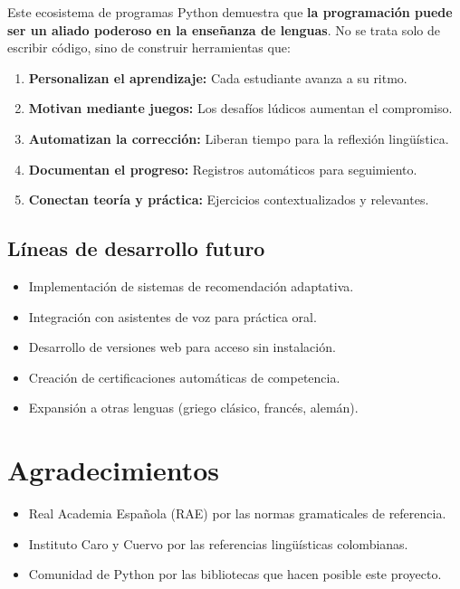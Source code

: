 \documentclass[12pt,spanish]{article}
\begin{document}
Este ecosistema de programas Python demuestra que \textbf{la programación puede ser un aliado poderoso en la enseñanza de lenguas}. No se trata solo de escribir código, sino de construir herramientas que:

\begin{enumerate}
    \item \textbf{Personalizan el aprendizaje:} Cada estudiante avanza a su ritmo.
    \item \textbf{Motivan mediante juegos:} Los desafíos lúdicos aumentan el compromiso.
    \item \textbf{Automatizan la corrección:} Liberan tiempo para la reflexión lingüística.
    \item \textbf{Documentan el progreso:} Registros automáticos para seguimiento.
    \item \textbf{Conectan teoría y práctica:} Ejercicios contextualizados y relevantes.
\end{enumerate}

\subsection{Líneas de desarrollo futuro}

\begin{itemize}
    \item Implementación de sistemas de recomendación adaptativa.
    \item Integración con asistentes de voz para práctica oral.
    \item Desarrollo de versiones web para acceso sin instalación.
    \item Creación de certificaciones automáticas de competencia.
    \item Expansión a otras lenguas (griego clásico, francés, alemán).
\end{itemize}

\section{Agradecimientos}

\begin{itemize}
    \item Real Academia Española (RAE) por las normas gramaticales de referencia.
    \item Instituto Caro y Cuervo por las referencias lingüísticas colombianas.
    \item Comunidad de Python por las bibliotecas que hacen posible este proyecto.
\end{itemize}
\end{document}
